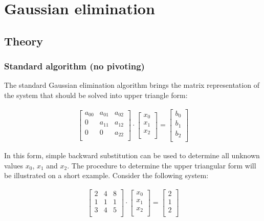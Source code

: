 \newpage
\section{Gaussian elimination}
\label{sec:gaussianElimination}
\subsection{Theory}

\subsubsection{Standard algorithm (no pivoting)}
The standard Gaussian elimination algorithm brings the matrix representation of the system that should be solved into upper triangle form:


\begin{align}
\label{eq:gauss3x3upperTriangle}
\begin{bmatrix}
a_{00}&a_{01}&a_{02}\\
0&a_{11}&a_{12}\\
0&0&a_{22}\\
\end{bmatrix}
\cdot
\begin{bmatrix}
x_0\\
x_1\\
x_2\\
\end{bmatrix}
=
\begin{bmatrix}
b_0\\
b_1\\
b_2\\
\end{bmatrix}
\end{align}

In this form, simple backward substitution can be used to determine all unknown values $x_0$, $x_1$ and $x_2$.
The procedure to determine the upper triangular form will be illustrated on a short example.
Consider the following system:

\begin{align}
\label{eq:gauss3x3unmodified}
\begin{bmatrix}
	2&4&8\\
	1&1&1\\
	3&4&5\\
\end{bmatrix}
\cdot
\begin{bmatrix}
x_0\\
x_1\\
x_2\\
\end{bmatrix}
=
\begin{bmatrix}
2\\
1\\
2\\
\end{bmatrix}
\end{align}

